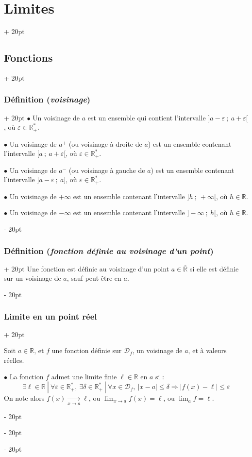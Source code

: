 \documentclass[a4paper, 12pt, twoside]{article}
\newcommand{\R}{\mathbb{R}} %
\newcommand{\cj}[1]{\overline{#1}} %
\newcommand{\tendsto}[1]{\xrightarrow[#1]{}}
\newcommand{\abs}[1]{\left\lvert #1 \right\rvert}
\renewcommand{\le}{\leqslant}
\newcommand{\ep}{\varepsilon}
\newcommand{\ind}[1][20pt]{\advance\leftskip + #1}
\newcommand{\deind}[1][20pt]{\advance\leftskip - #1}
\newenvironment{indt}[2][20pt]{#2 \par \ind[#1]}{\par \deind} %
\begin{document}
\begin{indt}{\section{Limites}}
\begin{indt}{\subsection{Fonctions}}
\begin{indt}{\subsubsection{Définition (\textit{voisinage})}}
                $\bullet$ Un voisinage de $a$ est un ensemble qui contient l'intervalle $]a - \ep\ ;\ a + \ep[$, où $\ep \in \R_+^*$.

                $\bullet$ Un voisinage de $a^+$ (ou voisinage à droite de $a$) est un ensemble contenant l'intervalle $[a\ ;\ a + \ep[$, où $\ep \in \R_+^*$.

                $\bullet$ Un voisinage de $a^-$ (ou voisinage à gauche de $a$) est un ensemble contenant l'intervalle $]a - \ep\ ;\ a]$, où $\ep \in \R_+^*$.

                $\bullet$ Un voisinage de $+\infty$ est un ensemble contenant l'intervalle $]h\ ;\ +\infty[$, où $h \in \R$.

                $\bullet$ Un voisinage de $-\infty$ est un ensemble contenant l'intervalle $]-\infty\ ;\ h[$, où $h \in \R$.
            \end{indt}

            \vspace{12pt}
            
            \begin{indt}{\subsubsection{Définition (\textit{fonction définie au voisinage d'un point})}}
                Une fonction est définie au voisinage d'un point $a \in \cj \R$ si elle est définie sur un voisinage de $a$, sauf peut-être en $a$.
            \end{indt}

            \vspace{12pt}
            
            \begin{indt}{\subsubsection{Limite en un point réel}}
                \label{1.2.3}

                Soit $a \in \R$, et $f$ une fonction définie sur $\mathcal D_f$, un voisinage de $a$, et à valeurs réelles.

                \vspace{6pt}
                
                $\bullet$ La fonction $f$ admet une limite finie $\ell \in \R$ en $a$ si :
                \[
                    \exists \ell \in \R\ |\ \forall \ep \in \R_+^*,\ \exists \delta \in \R_+^*\ |\ \forall x \in \mathcal D_f,\ \abs{x - a} \le \delta \Rightarrow \abs{f(x) - \ell} \le \ep
                \]
                On note alors $f(x) \tendsto{x \to a} \ell$, ou $\displaystyle \lim_{x \to a}f(x) = \ell$, ou $\displaystyle \lim_a f = \ell$.


\end{indt}
\end{indt}
\end{indt}
\end{document}
